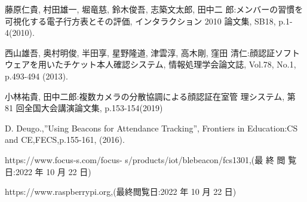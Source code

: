 \documentclass[a4j,8pt,twocolumn]{extarticle}
\begin{document}
\begin{thebibliography}{9}

藤原仁貴, 村田雄一, 堀竜慈, 鈴木俊吾, 志築文太郎, 田中二 郎:メンバーの習慣を可視化する電子行方表とその評価, インタラクション 2010 論文集, SB18, p.1-4(2010).

西山雄吾, 奥村明俊, 半田享, 星野隆道, 津雲淳, 高木剛, 窪田 清仁:顔認証ソフトウェアを用いたチケット本人確認システム, 情報処理学会論文誌, Vol.78, No.1, p.493-494 (2013).

小林祐貴, 田中二郎:複数カメラの分散協調による顔認証在室管 理システム, 第 81 回全国大会講演論文集, p.153-154(2019)

D. Deugo.,”Using Beacons for Attendance Tracking”, Frontiers in Education:CS and CE,FECS,p.155-161, (2016).

https://www.focus-s.com/focus- s/products/iot/blebeacon/fcs1301,(最 終 閲 覧 日:2022 年 10 月 22 日)

https://www.raspberrypi.org,(最終閲覧日:2022 年 10 月 22 日)






\end{thebibliography}




\end{document}
